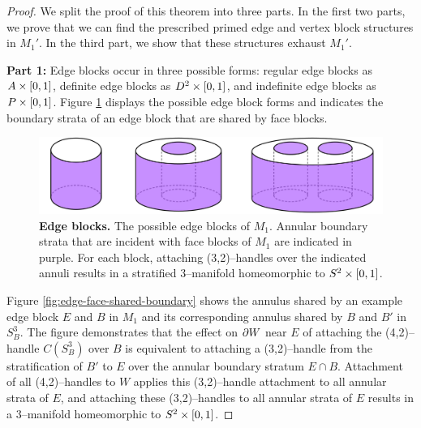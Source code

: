 \begin{proof}
	We split the proof of this theorem into three parts.
	In the first two parts, we prove that we can find the prescribed primed edge and vertex block structures in $M_1'$.
	In the third part, we show that these structures exhaust $M_1'$.
	
	\textbf{Part 1:}
	Edge blocks occur in three possible forms: regular edge blocks as $A\times[0,1]$, definite edge blocks as $D^2\times[0,1]$, and indefinite edge blocks as $P\times[0,1]$.
	Figure \ref{fig:edge-block-incidence} displays the possible edge block forms and indicates the boundary strata of an edge block that are shared by face blocks.
	
	\begin{figure}[h!]
		\centering
		\includegraphics[width=\textwidth]{figures/edge-block-incidence.png}
		\caption{
			\textbf{Edge blocks.}
			The possible edge blocks of $M_1$.
			Annular boundary strata that are incident with face blocks of $M_1$ are indicated in purple.
			For each block, attaching (3,2)--handles over the indicated annuli results in a stratified 3--manifold homeomorphic to $S^2\times[0,1]$.
		}
		\label{fig:edge-block-incidence}
	\end{figure}
	
	Figure \ref{fig:edge-face-shared-boundary} shows the annulus shared by an example edge block $E$ and $B$ in $M_1$ and its corresponding annulus shared by $B$ and $B'$ in $S_B^3$.
	The figure demonstrates that the effect on $\partial W$ near $E$ of attaching the (4,2)--handle $C(S_B^3)$ over $B$ is equivalent to attaching a (3,2)--handle from the stratification of $B'$ to $E$ over the annular boundary stratum $E\cap B$.
	Attachment of all (4,2)--handles to $W$ applies this (3,2)--handle attachment to all annular strata of $E$, and attaching these (3,2)--handles to all annular strata of $E$ results in a 3--manifold homeomorphic to $S^2\times[0,1]$.


\end{proof}
